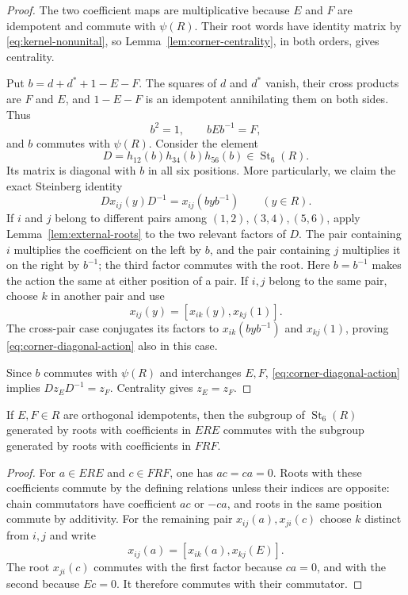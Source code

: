 \begin{proof}
The two coefficient maps are multiplicative because $E$ and $F$
are idempotent and commute with $\psi(R)$.  Their root words have
identity matrix by \eqref{eq:kernel-nonunital}, so
Lemma~\ref{lem:corner-centrality}, in both orders, gives centrality.

Put $b=d+d^*+1-E-F$.  The squares of $d$ and $d^*$ vanish,
their cross products are $F$ and $E$, and $1-E-F$ is an idempotent
annihilating them on both sides.  Thus
\[
 b^2=1,\qquad bEb^{-1}=F,
\]
and $b$ commutes with $\psi(R)$.  Consider the element
\[
 D=h_{12}(b)h_{34}(b)h_{56}(b)
       \in\operatorname{St}_6(R).
\]
Its matrix is diagonal with $b$ in all six positions.  More
particularly, we claim the exact Steinberg identity
\begin{equation}\label{eq:corner-diagonal-action}
 Dx_{ij}(y)D^{-1}=x_{ij}(byb^{-1})
       \qquad(y\in R).
\end{equation}
If $i$ and $j$ belong to different pairs among
$(1,2),(3,4),(5,6)$, apply Lemma~\ref{lem:external-roots} to
the two relevant factors of $D$.  The pair containing $i$
multiplies the coefficient on the left by $b$, and the pair
containing $j$ multiplies it on the right by $b^{-1}$; the third
factor commutes with the root.  Here $b=b^{-1}$ makes the action
the same at either position of a pair.
If $i,j$ belong to the same pair, choose $k$ in another pair and use
\[
 x_{ij}(y)=[x_{ik}(y),x_{kj}(1)].
\]
The cross-pair case conjugates its factors to
$x_{ik}(byb^{-1})$ and $x_{kj}(1)$, proving
\eqref{eq:corner-diagonal-action} also in this case.

Since $b$ commutes with $\psi(R)$ and interchanges $E,F$,
\eqref{eq:corner-diagonal-action} implies $Dz_ED^{-1}=z_F$.
Centrality gives $z_E=z_F$.
\end{proof}

\begin{lemma}\label{lem:orthogonal-root-images}
If $E,F\in R$ are orthogonal idempotents, then the subgroup of
$\operatorname{St}_6(R)$ generated by roots with coefficients in
$ERE$ commutes with the subgroup generated by roots with
coefficients in $FRF$.
\end{lemma}

\begin{proof}
For $a\in ERE$ and $c\in FRF$, one has $ac=ca=0$.  Roots with
these coefficients commute by the defining relations unless their
indices are opposite: chain commutators have coefficient $ac$ or
$-ca$, and roots in the same position commute by additivity.
For the remaining pair $x_{ij}(a),x_{ji}(c)$ choose $k$ distinct
from $i,j$ and write
\[
 x_{ij}(a)=[x_{ik}(a),x_{kj}(E)].
\]
The root $x_{ji}(c)$ commutes with the first factor because $ca=0$,
and with the second because $Ec=0$.  It therefore commutes with
their commutator.
\end{proof}

